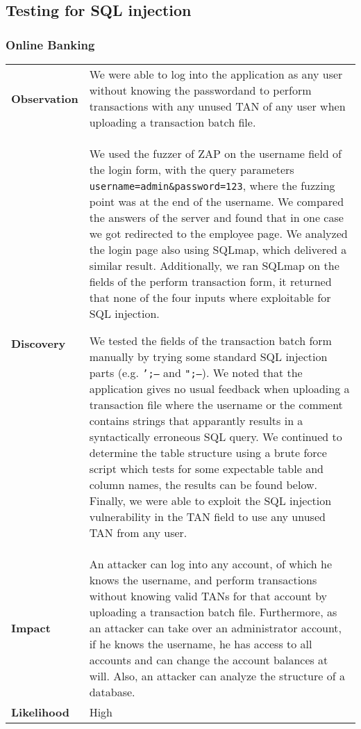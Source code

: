 \subsection{Testing for SQL injection}
\subsubsection*{Online Banking}\label{sql:injection:online}

\begin{tabular}{l|p{10cm}}

\textbf{Observation} & We were able to log into the application as any user without knowing the passwordand to perform transactions with any unused TAN of any user when uploading a transaction batch file. \\
\textbf{Discovery} & We used the fuzzer of ZAP on the username field of the login form, with the query parameters \texttt{username=admin\&password=123}, where the fuzzing point was at the end of the username. We compared the answers of the server and found that in one case we got redirected to the employee page. We analyzed the login page also using SQLmap, which delivered a similar result. Additionally, we ran SQLmap on the fields of the perform transaction form, it returned that none of the four inputs where exploitable for SQL injection.

We tested the fields of the transaction batch form manually by trying some standard SQL injection parts (e.g. \texttt{';--} and \texttt{";--}). We noted that the application gives no usual feedback when uploading a transaction file where the username or the comment contains strings that apparantly results in a syntactically erroneous SQL query. We continued to determine the table structure using a brute force script which tests for some expectable table and column names, the results can be found below. Finally, we were able to exploit the SQL injection vulnerability in the TAN field to use any unused TAN from any user. \\
\textbf{Impact} & An attacker can log into any account, of which he knows the username, and perform transactions without knowing valid TANs for that account by uploading a transaction batch file. Furthermore, as an attacker can take over an administrator account, if he knows the username, he has access to all accounts and can change the account balances at will. Also, an attacker can analyze the structure of a database. \\
\textbf{Likelihood} & High \\
\end{tabular}

